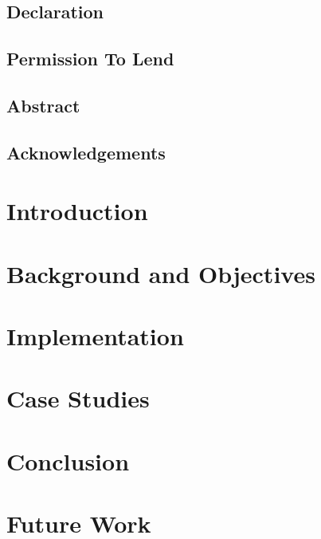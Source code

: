 \documentclass{report}
\begin{document}
	\hypersetup{pageanchor=false}
	
	\hypersetup{pageanchor=true}


	\section*{Declaration}
	
	\pagebreak

	\section*{Permission To Lend}
	
	\pagebreak

	\section*{Abstract}
	
	\pagebreak

	\section*{Acknowledgements}
	
	\pagebreak

	\tableofcontents
	\cleardoublepage

	\chapter{Introduction}
	

	\chapter{Background and Objectives}
	

	\chapter{Implementation}
	

	\chapter{Case Studies}
	

	\chapter{Conclusion}
	

	\chapter{Future Work}
	

	\clearpage
	\printbibliography
\end{document}
